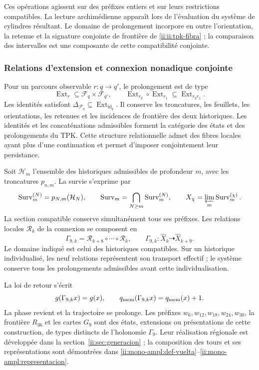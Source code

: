 Ces opérations agissent sur des préfixes entiers et sur leurs restrictions compatibles. La lecture archimédienne apparaît lors de l'évaluation du système de cylindres résultant. Le domaine de prolongement incorpore en outre l'orientation, la retenue et la signature conjointe de frontière de \eqref{ii:ii:tpk-fibra} ; la comparaison des intervalles est une composante de cette compatibilité conjointe.

\subsubsection{Relations d'extension et connexion nonadique conjointe}

Pour un parcours observable \(r:q\to q'\), le prolongement est de type
\[
 \operatorname{Ext}_r\subseteq\mathcal F_q\times\mathcal F_{q'},
 \qquad
 \operatorname{Ext}_{r_2}\circ\operatorname{Ext}_{r_1}
 \subseteq\operatorname{Ext}_{r_2r_1}.
\]
Les identités satisfont \(\Delta_{\mathcal F_q}\subseteq
\operatorname{Ext}_{\operatorname{id}_q}\). Il conserve les troncatures, les feuillets, les orientations, les retenues et les incidences de frontière des deux historiques. Les identités et les concaténations admissibles forment la catégorie des états et des prolongements du TPK. Cette structure relationnelle admet des fibres locales ayant plus d'une continuation et permet d'imposer conjointement leur persistance.

Soit \(\mathcal H_m\) l'ensemble des historiques admissibles de profondeur \(m\), avec les troncatures \(p_{n,m}\). La survie s'exprime par
\[
 \operatorname{Surv}_m^{(N)}=p_{N,m}(\mathcal H_N),\qquad
 \operatorname{Surv}_m=\bigcap_{N\geq m}
 \operatorname{Surv}_m^{(N)},\qquad
 X_\chi=\varprojlim_m\operatorname{Surv}_m^{(\chi)}.
\]
La section compatible conserve simultanément tous ses préfixes. Les relations locales \(\mathcal R_k\) de la connexion se composent en
\begin{equation}
 \Gamma_{9,k}=\mathcal R_{k+8}\circ\cdots\circ\mathcal R_k,\qquad
 \Gamma_{9,k}:\widehat X_k\dashrightarrow\widehat X_{k+9}.
 \label{ii:ii:tpk-holonomia}
\end{equation}
Le domaine indiqué est celui des historiques compatibles. Sur un historique individualisé, les neuf relations représentent son transport effectif ; le système conserve tous les prolongements admissibles avant cette individualisation.

La loi de retour s'écrit
\[
 g(\Gamma_{9,k}x)=g(x),\qquad
 q_{\rm mem}(\Gamma_{9,k}x)=q_{\rm mem}(x)+1.
\]
La phase revient et la trajectoire se prolonge. Les préfixes \(w_6,w_{12},w_{18},w_{24},w_{30}\), la frontière \(R_{36}\) et les cartes \(G_9\) sont des états, extensions ou présentations de cette construction, de types distincts de l’holonomie \(\Gamma_9\). Leur réalisation régionale est développée dans la section~\ref{ii:sec:generacion} ; la composition des tours et ses représentations sont démontrées dans \ref{ii:mono-ampl:def-vuelta}--\ref{ii:mono-ampl:representacion}.

